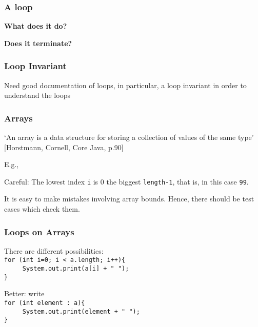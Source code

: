 \documentclass{beamer}
\def\mcolor#1#2{\rule{0ex}{0ex}\color{#1}#2\color{black}{}}
\begin{document}

\begin{frame}
\frametitle{A loop}


\mcolor{blue}{\textbf{What does it do?}}\\
\mcolor{blue}{\textbf{Does it terminate?}}
\end{frame}


\begin{frame}
\frametitle{Loop Invariant}

\mcolor{blue}{Need good documentation of loops, in particular, a loop invariant
 in order to understand the loops}


\end{frame}


\begin{frame}
\frametitle{Arrays}
\mcolor{blue}{`An array is a data structure for storing a collection
  of values of the same type'} [Horstmann, Cornell, Core Java, p.90]

E.g., 


Careful: The lowest index \texttt{i} is 0 the biggest \texttt{length-1},
that is, in this case \texttt{99}. 
\mcolor{blue}{It is easy to make mistakes involving array bounds. Hence, there should be test cases which check them.}
\end{frame}

\begin{frame}
\frametitle{Loops on Arrays}
There are different possibilities:\\[1ex]
\texttt{for (int i=0; i < a.length; i++)\{}\\
\texttt{\ \ \ \ \ System.out.print(a[i] + " ");}\\
\texttt{\}}\bigskip

Better: write\\[1ex]
\texttt{for (int element : a)\{}\\
\texttt{\ \ \ \ \ System.out.print(element + " ");}\\
\texttt{\}}
\end{frame}
\end{document}
